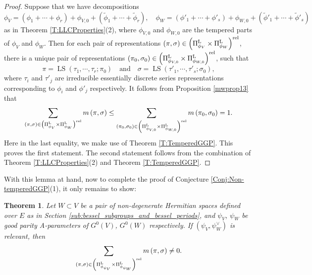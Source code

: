\documentclass[11pt,letterpaper]{amsart}
\theoremstyle{plain}
\newcounter{theorem}[section]
\numberwithin{theorem}{section}
\numberwithin{equation}{subsection}
\newtheorem{Thm}[theorem]{Theorem}
\theoremstyle{remark}
\newcommand{\LS}{\operatorname{LS}} %
\def\LP{\Pi^{\rm L}} %
\def\rel{{\rm rel}} %
\begin{document}
\vskip 5pt

\begin{proof}
Suppose that we have decompositions
\[
    \phi_V = \left(\phi_1+\cdots+\phi_r\right) + \phi_{V,0} + \left(\widetilde{\phi}_1+\cdots+\widetilde{\phi}_r\right), \quad \phi_W = \left(\phi'_1+\cdots+\phi'_s\right) + \phi_{W,0} + \left(\widetilde{\phi}'_1+\cdots+\widetilde{\phi}'_s\right)
\]
as in Theorem \ref{T:LLCProperties}(2), where $\phi_{V,0}$ and $\phi_{W,0}$ are the tempered parts of $\phi_V$ and $\phi_W$. Then for each pair of representations $\left(\pi,\sigma\right)\in\left(\LP_{\phi_{V}}\times \LP_{\phi_{W}}\right)^{\rel}$, there is a unique pair of representations $\left(\pi_0,\sigma_0\right)\in\left(\LP_{\phi_{V,0}}\times \LP_{\phi_{W,0}}\right)^{\rel}$, such that
\[
    \pi=\LS\left(\tau_1,\cdots,\tau_r;\pi_0\right)\quad \text{and} \quad\sigma=\LS\left(\tau'_1,\cdots,\tau'_s;\sigma_0\right),
\]
where $\tau_i$ and $\tau'_j$ are irreducible essentially discrete series representations corresponding to $\phi_i$ and $\phi'_j$ respectively. It follows from Proposition \ref{mwprop13} that
\[
     \sum_{\left(\pi,\sigma\right)\in \left(\LP_{\phi_{V}}\times \LP_{\phi_{W}}\right)^{\rel}}m\left(\pi,\sigma\right) \leq  \sum_{\left(\pi_0,\sigma_0\right)\in \left(\LP_{\phi_{V,0}}\times \LP_{\phi_{W,0}}\right)^{\rel}}m\left(\pi_0,\sigma_0\right)=1.
\]
Here in the last equality, we make use of Theorem \ref{T:TemperedGGP}. This proves the first statement. The second statement follows from the combination of Theorem \ref{T:LLCProperties}(2) and Theorem \ref{T:TemperedGGP}.

\end{proof}

\vskip 5pt

With this lemma at hand, now to complete the proof of Conjecture \ref{Conj:Non-temperedGGP}(1), it only remains to show:

\begin{Thm}\label{T:RelevanceImpliesPeriod-GoodParity}
Let $W\subset V$ be a pair of non-degenerate Hermitian spaces defined over $E$ as in Section \ref{sub:bessel_subgroups_and_bessel_periods}, and $\psi_V$, $\psi_W$ be good parity A-parameters of $G^0\left(V\right)$, $G^0\left(W\right)$ respectively. If $\left(\psi_V,\psi_W^\vee\right)$ is relevant, then
\[
    \sum_{\left(\pi,\sigma\right)\in \left(\LP_{\phi_{\psi_V}}\times \LP_{\phi_{\psi_W}}\right)^\rel} m\left(\pi,\sigma\right)\neq0.
\]   
\end{Thm}

\vskip 5pt
\end{document}

